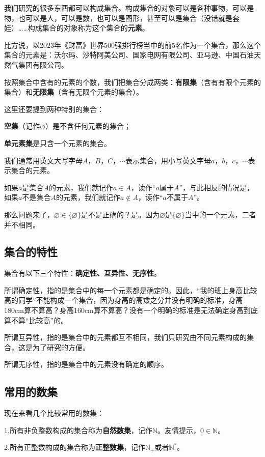 \documentclass[lang=cn,math=cm,chinesefont=nofont,11pt,scheme=chinese,onecol]{elegantbook}
\begin{document}
我们研究的很多东西都可以构成集合。构成集合的对象可以是各种事物，可以是物，也可以是人，可以是数，也可以是图形，甚至可以是集合（没错就是套娃）……构成集合的对象称为这个集合的\textbf{元素}。

比方说，以2023年《财富》世界500强排行榜当中的前5名作为一个集合，那么这个集合的元素是：沃尔玛、沙特阿美公司、国家电网有限公司、亚马逊、中国石油天然气集团有限公司。

按照集合中含有的元素的个数，我们把集合分成两类：\textbf{有限集}（含有有限个元素的集合）和\textbf{无限集}（含有无限个元素的集合）。

这里还要提到两种特别的集合：

\textbf{空集}（记作$\varnothing$）是不含任何元素的集合；

\textbf{单元素集}是只含一个元素的集合。

我们通常用英文大写字母$A$，$B$，$C$，$\cdots$表示集合，用小写英文字母$a$，$b$，$c$，$\cdots$表示集合的元素。

如果$a$是集合$A$的元素，我们就记作$a\in A$，读作“$a$属于$A$”，与此相反的情况是，如果$a$不是集合$A$的元素，我们就记作$a\notin A$，读作“$a$不属于$A$”。

那么问题来了，$\varnothing \in \{\varnothing\}$是不是正确的？是。因为$\varnothing$是$\{\varnothing\}$当中的一个元素，二者并不相同。

\subsection{集合的特性}
集合有以下三个特性：\textbf{确定性、互异性、无序性}。

所谓确定性，指的是集合中的每一个元素都是确定的。因此，“我的班上身高比较高的同学”不能构成一个集合，因为身高的高矮之分并没有明确的标准，身高180cm算不算高？身高160cm算不算高？没有一个明确的标准是无法确定身高到底算不算“比较高”的。

所谓互异性，指的是集合中的元素都互不相同，我们只研究由不同元素构成的集合，这是为了研究的方便。

所谓无序性，指的是集合中的元素没有确定的顺序。

\subsection{常用的数集}
现在来看几个比较常用的数集：

1.所有非负整数构成的集合称为\textbf{自然数集}，记作$\mathbb{N}$。友情提示，$0\in \mathbb{N}$。

2.所有正整数构成的集合称为\textbf{正整数集}，记作$\mathbb{N}_+$或者$\mathbb{N}^*$。
\end{document}
